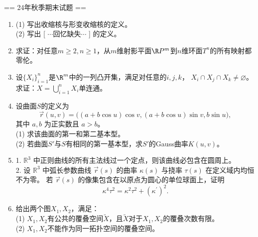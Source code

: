 == 24年秋季期末试题 ==
\begin{enumerate}
\item[一] (1) 写出收缩核与形变收缩核的定义。\\
(2) 写出 [$\,\,\cdots$回忆缺失$\cdots\,\,$] 的定义。
\item[二] 求证：对任意$m\ge2,n\ge1$，从$m$维射影平面$\R P^m$到$n$维环面$T^n$的所有映射都零伦。
\item[三] 设$\{X_i\}_{i=1}^{n}$是$\R^m$中的一列凸开集，满足对任意的$i,j,k$，
$X_i \cap X_j \cap X_k\ne\varnothing$。求证：$X=\bigcup\limits_{i=1}^{n}X_i$单连通。
\item[四] 设曲面$S$的定义为
\[\vec{r}(u,v)=\big((a+b \cos u) \cos v,(a+b \cos u) \sin v, b \sin u\big),\]
其中 $a,b$ 为正实数且 $a>b$。\\
(1) 求该曲面的第一和第二基本型。\\
(2) 若曲面$S'$与$S$有相同的第一基本型，求$S'$的Gauss曲率$K(u,v)$。
\item[五] 1. $\mathbb{R}^3$ 中正则曲线的所有主法线过一个定点，则该曲线必包含在圆周上。\\
2. 设 $\mathbb{R}^3$ 中弧长参数曲线 $\vec{r}(s)$ 的曲率 $\kappa(s)$ 与挠率 $\tau(s)$ 在定义域内均恒不为零。
若 $\vec{r}(s)$ 的像集包含在以原点为圆心的单位球面上，证明
\[\kappa^4 \tau^2=\kappa^2 \tau^2+(\kappa^{\prime})^2.\]
\item[六] 给出两个图$X_1,X_2$，满足：\\
(1) $X_1,X_2$有公共的覆叠空间$\tilde{X}$，且$\tilde{X}$对于$X_1,X_2$的覆叠次数有限。\\
(2) $X_1,X_2$不能作为同一拓扑空间的覆叠空间。
\end{enumerate}

